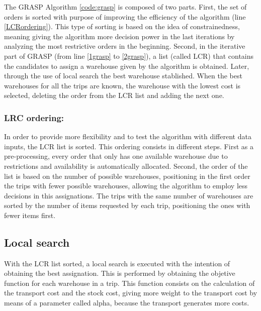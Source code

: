 \documentclass[letterpaper]{article} %
\begin{document}
The GRASP Algorithm \ref{code:grasp} is composed of two parts. First, the set of orders is sorted with purpose of improving the efficiency of the algorithm (line \ref{LCRordering}). This type of sorting is based on the idea of constrainedness, meaning giving the algorithm more decision power in the last iterations by analyzing the most restrictive orders in the beginning. Second, in the iterative part of GRASP (from line \ref{1grasp} to \ref{2grasp}), a list (called LCR) that contains the candidates to assign a warehouse given by the algorithm is obtained. Later, through the use of local search the best warehouse stablished. When the best warehouses for all the trips are known, the warehouse with the lowest cost is selected, deleting the order from the LCR list and adding the next one.

\subsubsection*{LRC ordering:}
In order to provide more flexibility and to test the algorithm with different data inputs, the LCR list is sorted. This ordering consists in different steps. First as a pre-processing, every order that only has one available warehouse due to restrictions and availability is automatically allocated. Second, the order of the list is based on the number of possible warehouses, positioning in the first order the trips with fewer possible warehouses, allowing the algorithm to employ less decisions in this assignations. The trips with the same number of warehouses are sorted by the number of items requested by each trip, positioning the ones with fewer items first.



\subsection*{Local search}
With the LCR list sorted, a local search is executed with the intention of obtaining the best assignation. This is performed by obtaining the objetive function for each warehouse in a trip. This function consists on the calculation of the transport cost and the stock cost, giving more weight to the transport cost by means of a parameter called alpha, because the transport generates more costs.
\end{document}
